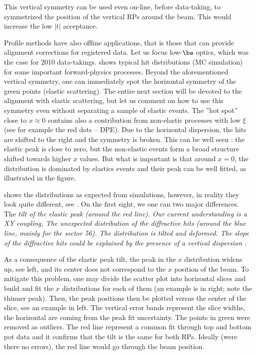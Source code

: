 This vertical symmetry can be used even on-line, before data-taking, to symmetrized the position of the vertical RPs around the beam. This would increase the low $|t|$ acceptance.

Profile methods have also offline applications, that is those that can provide alignment corrections for registered data. Let us focus low-$\be$ optics, which was the case for 2010 data-takings.  shows typical hit distributions (MC simulation) for some important forward-physics processes. Beyond the aforementioned vertical symmetry, one can immediately spot the horizontal symmetry of the green points (elastic scattering). The entire next section will be devoted to the alignment with elastic scattering, but let us comment on how to use this symmetry even without separating a sample of elastic events. The ''hot spot'' close to $x\approx 0$ contains also a contribution from non-elastic processes with low $\xi$ (see for example the red dots -- DPE). Due to the horizontal dispersion, the hits are shifted to the right and the symmetry is broken. This can be well seen : the elastic peak is close to zero, but the non-elastic events form a broad structure shifted towards higher $x$ values. But what is important is that around $x=0$, the distribution is dominated by elastics events and their peak can be well fitted, as illustrated in the figure.

 shows the distributions as expected from simulations, however, in reality they look quite different, see . On the first sight, we one can two major differences.
\bitm
\itm The \em{tilt of the elastic peak} (around the red line). Our current understanding is a XY coupling, 
\itm The unexpected distribution of the diffractive hits (around the blue line, mainly for the sector 56). The distribution is tilted and deformed. The slope of the diffractive hits could be explained by the presence of a vertical dispersion .
\eitm

As a consequence of the elastic peak tilt, the peak in the $x$ distribution widens up, see  left, and its center does not correspond to the $x$ position of the beam. To mitigate this problem, one may divide the scatter plot into horizontal slices and build and fit the $x$ distributions for each of them (an example is in  right; note the thinner peak). Then, the peak positions then be plotted versus the center of the slice, see an example in  left. The vertical error bands represent the slice widths, the horizontal are coming from the peak fit uncertainty. The points in green were removed as outliers. The red line represent a common fit through top and bottom pot data and it confirms that the tilt is the same for both RPs. Ideally (were there no errors), the red line would go through the beam position.

